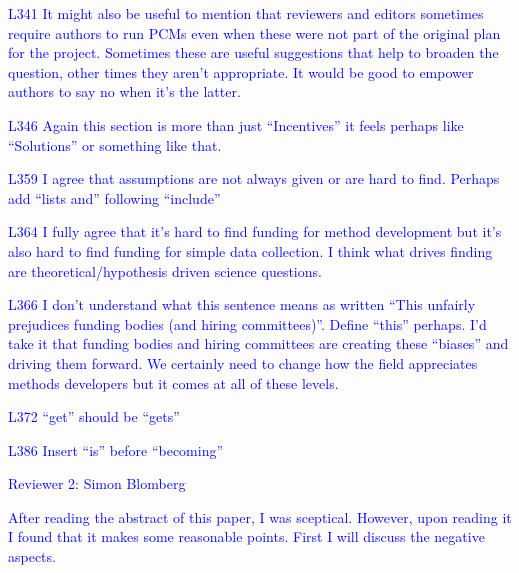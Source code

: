 \documentclass[12pt]{letter}
\begin{document}
\begin{letter}{}
\textcolor{blue}{L341 It might also be useful to mention that reviewers and editors sometimes require authors to run PCMs even when these were not part of the original plan for the project. Sometimes these are useful suggestions that help to broaden the question, other times they aren’t appropriate. It would be good to empower authors to say no when it’s the latter.}

\textcolor{blue}{L346 Again this section is more than just “Incentives” it feels perhaps like “Solutions” or something like that.}

\textcolor{blue}{L359 I agree that assumptions are not always given or are hard to find. Perhaps add “lists and” following “include”}

\textcolor{blue}{L364 I fully agree that it’s hard to find funding for method development but it’s also hard to find funding for simple data collection. I think what drives finding are theoretical/hypothesis driven science questions.}

\textcolor{blue}{L366 I don’t understand what this sentence means as written “This unfairly prejudices funding bodies (and hiring committees)”. Define “this” perhaps. I’d take it that funding bodies and hiring committees are creating these “biases” and driving them forward. We certainly need to change how the field appreciates methods developers but it comes at all of these levels.}

\textcolor{blue}{L372 “get” should be “gets”}

\textcolor{blue}{L386 Insert “is” before “becoming”}


\textcolor{blue}{Reviewer 2: Simon Blomberg}

\textcolor{blue}{After reading the abstract of this paper, I was sceptical. However, upon reading it I found that it makes some reasonable points. First I will discuss the negative aspects.}


\end{letter}
\end{document}

